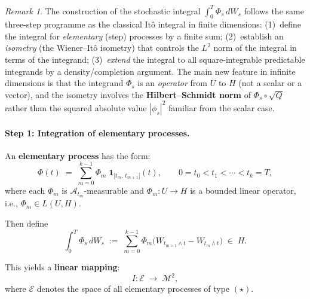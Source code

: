 \documentclass[11pt]{article}
\theoremstyle{definition}
\theoremstyle{remark}
\newtheorem{remark}{Remark}
\begin{document}
\begin{remark}
The construction of the stochastic integral $\int_0^T \Phi_s\,dW_s$ follows the same three-step programme as the classical It\^o integral in finite dimensions:
(1)~define the integral for \emph{elementary} (step) processes by a finite sum;
(2)~establish an \emph{isometry} (the Wiener--It\^o isometry) that controls the $L^2$ norm of the integral in terms of the integrand;
(3)~\emph{extend} the integral to all square-integrable predictable integrands by a density/completion argument.
The main new feature in infinite dimensions is that the integrand $\Phi_s$ is an \emph{operator} from $U$ to $H$ (not a scalar or a vector), and the isometry involves the \textbf{Hilbert--Schmidt norm} of $\Phi_s \circ \sqrt{Q}$ rather than the squared absolute value $|\phi_s|^2$ familiar from the scalar case.
\end{remark}

\paragraph{Step 1: Integration of elementary processes.}


An \textbf{elementary process} has the form:
\[
    \Phi(t)
    \;=\;
    \sum_{m=0}^{k-1} \Phi_m\;\mathbf{1}_{]t_m,\, t_{m+1}]}(t),
    \qquad
    0 = t_0 < t_1 < \cdots < t_k = T, \tag{$\star$}
\]
where each $\Phi_m$ is $\mathcal{A}_{t_m}$-measurable and
$\Phi_m \colon U \to H$ is a bounded linear operator,
i.e., $\Phi_m \in L(U, H)$.


Then define
\[
    \int_0^T \Phi_s\,dW_s
    \;:=\;
    \sum_{m=0}^{k-1}
    \Phi_m\!\bigl(W_{t_{m+1} \wedge t} - W_{t_m \wedge t}\bigr)
    \;\in\; H.
\]

This yields a \textbf{linear mapping}:
\[
    I \colon \mathcal{E}
    \;\longrightarrow\;
    \mathcal{M}^2,
\]
where $\mathcal{E}$ denotes the space of all elementary processes
of type $(\star)$.
\end{document}
